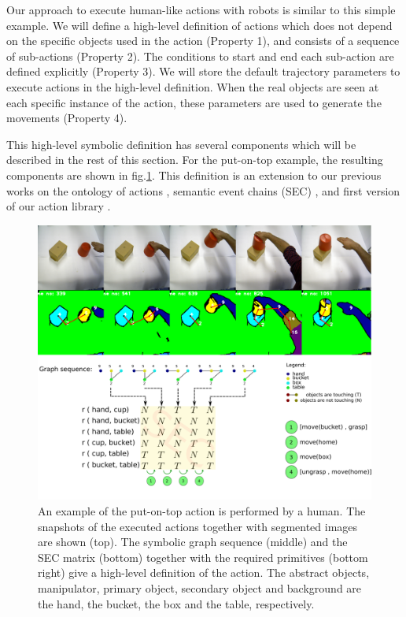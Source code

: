 Our approach to execute human-like actions with robots is similar to this simple example.
We will define a high-level definition of actions which does not depend on the specific objects used in the action (Property 1),
and consists of a sequence of sub-actions (Property 2).
The conditions to start and end each sub-action are defined explicitly (Property 3).
We will store the default trajectory parameters to execute actions in the high-level definition.
When the real objects are seen at each specific instance of the action, these parameters are used to generate the movements (Property 4).


This high-level symbolic definition has several components which will be described in the rest of this section.
For the put-on-top example, the resulting components are shown in fig.\ref{fig:action_graph_sec}.
This definition is an extension to our previous works on the ontology of actions \cite{TAMD13}, semantic event chains (SEC) \cite{Aksoy11b},
and first version of our action library \cite{aein2013toward}.
\begin{figure}
      \centering
      \includegraphics[scale=0.20]{./pdf/action_graph_sec.pdf}
      \caption{ An example of the put-on-top action is performed by a human. 
The snapshots of the executed actions together with segmented images are shown (top).
The symbolic graph sequence (middle) and the SEC matrix (bottom) together with 
the required primitives (bottom right) give a high-level definition of the action.
The abstract objects, manipulator, primary object, secondary object and background are the hand, the bucket, the box and the table, respectively.}
      \label{fig:action_graph_sec}
\end{figure}


